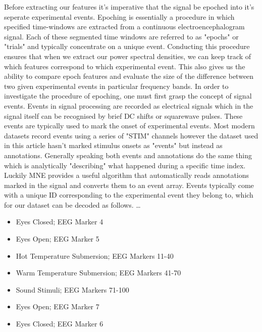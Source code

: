 \documentclass[11pt]{article}
\begin{document}
Before extracting our features it's imperative that the signal be epoched into it's seperate experimental events. Epoching is essentially a procedure in which specified time-windows are extracted from a continuous electroencephalogram signal. Each of these segmented time windows are referred to as "epochs" or "trials" and typically concentrate on a unique event. Conducting this procedure ensures that when we extract our power spectral densities, we can keep track of which features correspond to which experimental event. This also gives us the ability to compare epoch features and evaluate the size of the difference between two given experimental events in particular frequency bands. In order to investigate the procedure of epoching, one must first grasp the concept of signal events. Events in signal processing are recorded as electrical signals which in the signal itself can be recognised by brief DC shifts or squarewave pulses. These events are typically used to mark the onset of experimental events. Most modern datasets record events using a series of "STIM" channels however the dataset used in this article hasn't marked stimulus onsets as "events" but instead as annotations. Generally speaking both events and annotations do the same thing which is analytically "describing" what happened during a specific time index. Luckily MNE provides a useful algorithm that automatically reads annotations marked in the signal and converts them to an event array. Events typically come with a unique ID corresponding to the experimental event they belong to, which for our dataset can be decoded as follows. 
\dots
\begin{itemize}
\item Eyes Closed; EEG Marker 4
\item Eyes Open; EEG Marker 5
\item Hot Temperature Submersion; EEG Markers 11-40
\item Warm Temperature Submersion; EEG Markers 41-70
\item Sound Stimuli; EEG Markers 71-100
\item Eyes Open; EEG Marker 7
\item Eyes Closed; EEG Marker 6
\end{itemize}
\end{document}
